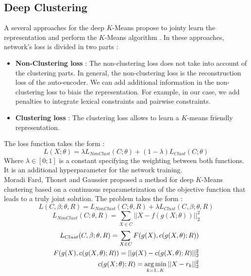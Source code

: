 \subsection{\label{seq:DeepClust}Deep Clustering}
A several approaches for the deep $K$-Means propose to jointy learn the
representation and perform the $K$-Means algorithm \cite{2018arXiv180107648A}.
In these approaches, network's loss is divided in two parts :
\begin{itemize}
\item \textbf{Non-Clustering loss} : The non-clustering loss does not
  take into account of the clustering parts. In general, the non-clustering 
  loss is the reconstruction loss of the auto-encoder. We can add additional 
  information in the non-clustering loss to biais the representation. For
  example, in our case, we add penalties to integrate lexical constraints
  and pairwise constraints.
\item \textbf{Clustering loss} : The clustering loss allows to learn a
  $K$-means friendly representation.
\end{itemize}
The loss function takes the form :
\begin{equation}
L(X;\theta) = \lambda L_{NonClust}(C;\theta) + (1-\lambda)L_{Clust}(C; \theta)
\end{equation}
Where $\lambda \in [0 ; 1]$ is a constant specifying the weighting between both 
functions.
It is an additional hyperparameter for the network training.\\
Moradi Fard, Thonet and Gaussier \cite{Deap-K-Means} proposed a method for deep $K$-Means 
clustering based on a continuous reparametrization of the objective function 
that leads to a truly joint solution. 
The problem takes the form : 
\begin{equation}
L(C ,\beta;\theta,R) = L_{NonClust}(C;\theta,R ) + \lambda L_{Clust}(C,\beta;\theta,R)
\end{equation}
\begin{equation}
L_{NonClust}(C;\theta,R ) = \sum_{X \in C} ||X - f(g(X;\theta))||_2^2
\end{equation}
\begin{equation}
\begin{aligned}
  L_{Clust}(C,\beta;\theta,R) = \sum_{X \in C}F(g(X),c(g(X, \theta); R))\\
  F(g(X),c(g(X, \theta); R)) = ||g(X) - c(g(X, \theta); R) ||_2^2\\
  c(g(X; \theta); R) = \operatorname*{arg\,min}_{k = 1 .. K} || X - r_k||_2^2
\end{aligned}
\end{equation}
